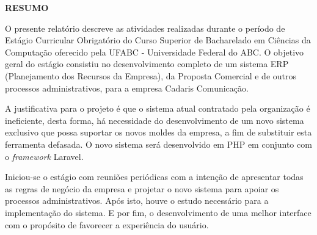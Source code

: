 \documentclass[
  12pt,				%
  openany,
  oneside,
  a4paper,			%
  english,			%
  brazil
]{article}
\numberwithin{figure}{section}
\numberwithin{table}{section}
\begin{document}
\begin{titlepage}

\begin{center}
  \textbf{RESUMO}
\end{center}

O presente relatório descreve as atividades realizadas durante o período de Estágio Curricular Obrigatório do Curso Superior de Bacharelado em Ciências da Computação oferecido pela UFABC - Universidade Federal do ABC. O objetivo geral do estágio consistiu no desenvolvimento completo de um sistema ERP (Planejamento dos Recursos da Empresa), da Proposta Comercial e de outros processos administrativos, para a empresa Cadaris Comunicação.

A justificativa para o projeto é que o sistema atual contratado pela organização é ineficiente, desta forma, há necessidade do desenvolvimento de um novo sistema exclusivo que possa suportar os novos moldes da empresa, a fim de substituir esta ferramenta defasada. O novo sistema será desenvolvido em PHP em conjunto com o \textit{framework} Laravel. 

Iniciou-se o estágio com reuniões periódicas com a intenção de apresentar todas as regras de negócio da empresa e projetar o novo sistema para apoiar os processos administrativos. Após isto, houve o estudo necessário para a implementação do sistema. E por fim, o desenvolvimento de uma melhor interface com o propósito de favorecer a experiência do usuário.

\end{titlepage}


%
%
%
%
%
\end{document}
